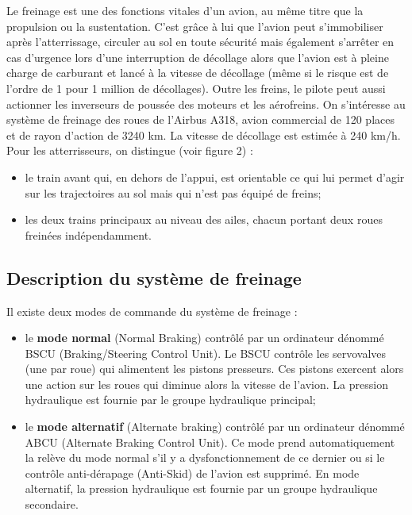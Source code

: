 \documentclass[10pt,oneside]{article}
\begin{document}
Le freinage est une des fonctions vitales d’un avion, au même titre que la
propulsion ou la sustentation.
C’est grâce à lui que l’avion peut s’immobiliser après l’atterrissage, circuler
au sol en toute sécurité mais
également s’arrêter en cas d’urgence lors d’une interruption de décollage alors
que l’avion est à pleine
charge de carburant et lancé à la vitesse de décollage (même si le risque est de
l’ordre de 1 pour 1 million
de décollages). Outre les freins, le pilote peut aussi actionner les inverseurs
de poussée des moteurs et les
aérofreins.
On s'intéresse au système de freinage des roues de l’Airbus A318, avion
commercial de 120 places et de
rayon d’action de 3240 km. La vitesse de décollage est estimée à 240 km/h. Pour
les atterrisseurs, on
distingue (voir figure 2) :
\begin{itemize}
 \item  le train avant qui, en dehors de
        l’appui, est orientable ce qui lui
        permet d’agir sur les trajectoires
        au sol mais qui n’est pas équipé
        de freins;
\item les deux trains principaux au
        niveau des ailes, chacun portant
        deux roues freinées
        indépendamment. 
\end{itemize}


\subsection*{Description du système de freinage}

    Il existe deux modes de commande du système de freinage :
\begin{itemize}
 \item le \textbf{mode normal} (Normal Braking) contrôlé par un ordinateur
dénommé BSCU
(Braking/Steering
         Control Unit). Le BSCU contrôle les servovalves (une par roue) qui
alimentent les pistons
         presseurs. Ces pistons exercent alors une action sur les roues qui
diminue alors la vitesse de
         l'avion. La pression hydraulique est fournie par le groupe hydraulique
principal;
\item le \textbf{mode alternatif} (Alternate braking) contrôlé par un ordinateur
dénommé
ABCU (Alternate
         Braking Control Unit). Ce mode prend automatiquement la relève du mode
normal s’il y a
         dysfonctionnement de ce dernier ou si le contrôle anti-dérapage
(Anti-Skid) de l’avion est
         supprimé. En mode alternatif, la pression hydraulique est fournie par
un groupe hydraulique
         secondaire.
\end{itemize}
\end{document}
